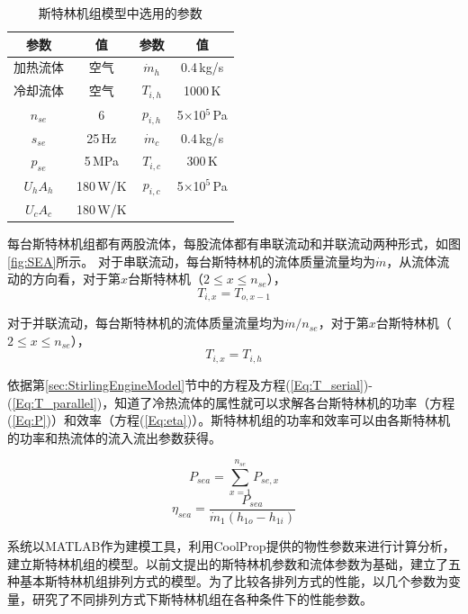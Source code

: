 \begin{table}[htbp]
\setlength{\abovecaptionskip}{-10pt}
	\caption{斯特林机组模型中选用的参数}
	\begin{center}
	\begin{tabular}{cccc}
		\toprule
		参数		&	值	& 参数	&	值\\
		\midrule
		加热流体	&	空气		&	$\dot{m}_h$	&	0.4\,kg/s\\
		冷却流体	&	空气	&	$T_{i,h}$	&	1000\,K\\
		$n_{se}$	&	6	&	$p_{i,h}$	&	5$\times$10$^5$\,Pa\\
		$s_{se}$	&	25\,Hz	&	$\dot{m}_c$	&	0.4\,kg/s\\
		$p_{se}$		&	5\,MPa	&	$T_{i,c}$	&	300\,K\\
		$U_hA_h$	&	180\,W/K	&	$p_{i,c}$	&	5$\times$10$^5$\,Pa\\
		$U_cA_c$		&	180\,W/K	&&\\
		\bottomrule
	\end{tabular}
	\end{center}
	\label{tab:parameters}
\end{table}

每台斯特林机组都有两股流体，每股流体都有串联流动和并联流动两种形式，如图\ref{fig:SEA}所示。
对于串联流动，每台斯特林机的流体质量流量均为$\dot{m}$，从流体流动的方向看，对于第$x$台斯特林机（$2\leqslant{}x\leqslant{}n_{se}$），
\begin{equation}
	T_{i,x} = T_{o,x-1}
	\label{Eq:T_serial}
\end{equation}

对于并联流动，每台斯特林机的流体质量流量均为$\dot{m}/n_{se}$，对于第$x$台斯特林机（$2\leqslant{}x\leqslant{}n_{se}$），
\begin{equation}
	T_{i,x} = T_{i,h}
	\label{Eq:T_parallel}
\end{equation}

依据第\ref{sec:StirlingEngineModel}节中的方程及方程(\ref{Eq:T_serial})-(\ref{Eq:T_parallel})，知道了冷热流体的属性就可以求解各台斯特林机的功率（方程(\ref{Eq:P})）和效率（方程(\ref{Eq:eta})）。斯特林机组的功率和效率可以由各斯特林机的功率和热流体的流入流出参数获得。

\begin{equation}
	P_{sea} = \sum_{x = 1}^{n_{se}}P_{se,x}
\end{equation}
\begin{equation}
	\eta_{sea} = \dfrac{P_{sea}}{\dot{m}_1(h_{1o} - h_{1i})}
\end{equation}

系统以MATLAB作为建模工具，利用CoolProp提供的物性参数来进行计算分析，建立斯特林机组的模型。以前文提出的斯特林机参数和流体参数为基础，建立了五种基本斯特林机组排列方式的模型。为了比较各排列方式的性能，以几个参数为变量，研究了不同排列方式下斯特林机组在各种条件下的性能参数。

